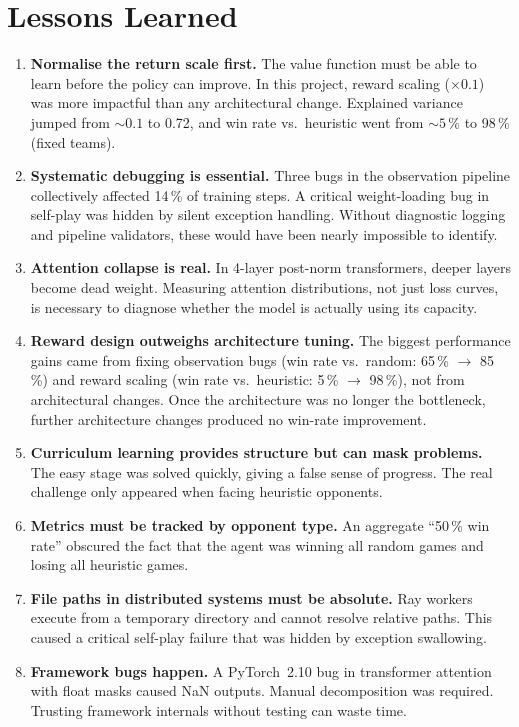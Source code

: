 \section{Lessons Learned}

\begin{enumerate}
  \item \textbf{Normalise the return scale first.}  The value function must
        be able to learn before the policy can improve.  In this project,
        reward scaling ($\times 0.1$) was more impactful than any architectural
        change.  Explained variance jumped from ${\sim}0.1$ to 0.72, and win
        rate vs.\ heuristic went from ${\sim}5$\,\% to 98\,\% (fixed teams).

  \item \textbf{Systematic debugging is essential.}  Three bugs in the
        observation pipeline collectively affected 14\,\% of training steps.
        A critical weight-loading bug in self-play was hidden by silent
        exception handling.  Without diagnostic logging and pipeline
        validators, these would have been nearly impossible to identify.

  \item \textbf{Attention collapse is real.}  In 4-layer post-norm
        transformers, deeper layers become dead weight.  Measuring attention
        distributions, not just loss curves, is necessary to diagnose whether
        the model is actually using its capacity.

  \item \textbf{Reward design outweighs architecture tuning.}  The biggest
        performance gains came from fixing observation bugs (win rate vs.\
        random: 65\,\% $\to$ 85\,\%) and reward scaling (win rate vs.\
        heuristic: 5\,\% $\to$ 98\,\%), not from architectural changes.  Once
        the architecture was no longer the bottleneck, further architecture
        changes produced no win-rate improvement.

  \item \textbf{Curriculum learning provides structure but can mask problems.}
        The easy stage was solved quickly, giving a false sense of progress.
        The real challenge only appeared when facing heuristic opponents.

  \item \textbf{Metrics must be tracked by opponent type.}  An aggregate
        ``50\,\% win rate'' obscured the fact that the agent was winning all
        random games and losing all heuristic games.

  \item \textbf{File paths in distributed systems must be absolute.}  Ray
        workers execute from a temporary directory and cannot resolve relative
        paths.  This caused a critical self-play failure that was hidden by
        exception swallowing.

  \item \textbf{Framework bugs happen.}  A PyTorch~2.10 bug in transformer
        attention with float masks caused NaN outputs.  Manual decomposition
        was required.  Trusting framework internals without testing can waste
        time.
\end{enumerate}

